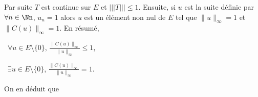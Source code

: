 {{Par suite $T$ est continue sur $E$ et $|||T|||\leqslant1$. Ensuite, si $u$ est la suite définie par $\forall n\in\Nn$, $u_n = 1$ alors $u$ est un élément non nul de $E$ tel que $\|u\|_\infty=1$ et $\|C(u)\|_\infty=1$. En résumé,

\textbullet~$\forall u\in E\setminus\{0\}$, $ \frac{\|C(u)\|_\infty}{\|u\|_\infty}\leqslant1$,

\textbullet~$\exists u\in E\setminus\{0\}$, $ \frac{\|C(u)\|_\infty}{\|u\|_\infty}=1$.

On en déduit que

\begin{center}
\end{center}
}
}
